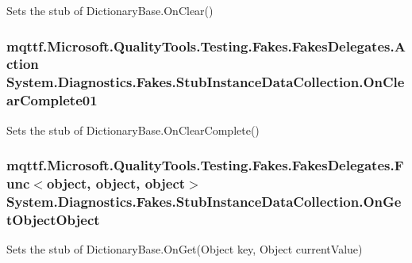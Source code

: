 Sets the stub of Dictionary\-Base.\-On\-Clear()

\hypertarget{class_system_1_1_diagnostics_1_1_fakes_1_1_stub_instance_data_collection_a40d83b7338488c88c14b9773949305fa}{
\subsubsection[{On\-Clear\-Complete01}]{\setlength{\rightskip}{0pt plus 5cm}mqttf.\-Microsoft.\-Quality\-Tools.\-Testing.\-Fakes.\-Fakes\-Delegates.\-Action System.\-Diagnostics.\-Fakes.\-Stub\-Instance\-Data\-Collection.\-On\-Clear\-Complete01}}\label{class_system_1_1_diagnostics_1_1_fakes_1_1_stub_instance_data_collection_a40d83b7338488c88c14b9773949305fa}


Sets the stub of Dictionary\-Base.\-On\-Clear\-Complete()

\hypertarget{class_system_1_1_diagnostics_1_1_fakes_1_1_stub_instance_data_collection_a345956f480224d88b24b500d3502a1ae}{
\subsubsection[{On\-Get\-Object\-Object}]{\setlength{\rightskip}{0pt plus 5cm}mqttf.\-Microsoft.\-Quality\-Tools.\-Testing.\-Fakes.\-Fakes\-Delegates.\-Func$<$object, object, object$>$ System.\-Diagnostics.\-Fakes.\-Stub\-Instance\-Data\-Collection.\-On\-Get\-Object\-Object}}\label{class_system_1_1_diagnostics_1_1_fakes_1_1_stub_instance_data_collection_a345956f480224d88b24b500d3502a1ae}


Sets the stub of Dictionary\-Base.\-On\-Get(\-Object key, Object current\-Value)

